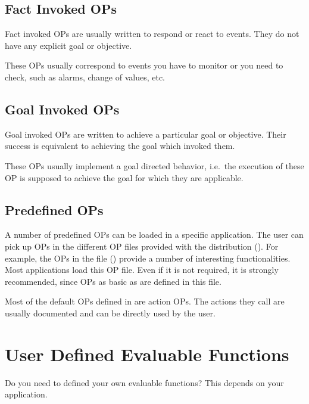 \subsection{Fact Invoked OPs}

Fact invoked OPs are usually written to respond or react to events. They do not
have any explicit goal or objective.

These OPs usually correspond to events you have to monitor or you need to
check, such as alarms, change of values, etc.

\subsection{Goal Invoked OPs}

Goal invoked OPs are written to achieve a particular goal or objective.
Their success is equivalent to achieving the goal which invoked them.

These OPs usually implement a goal directed behavior, i.e.\ the execution
of these OP is supposed to achieve the goal for which they are applicable.

\subsection{Predefined OPs}

A number of predefined OPs can be loaded in a specific application. The user
can pick up OPs in the different OP files provided with the distribution
(). For example, the OPs in the file 
() provide a number of interesting functionalities. 
Most applications load this OP file.  Even if it is not required, it is
strongly recommended, since OPs as basic as \code{=} are defined in this file.

Most of the default OPs defined in   are action OPs. The
actions they call are usually documented and can be directly used by the
user.

\section{User Defined Evaluable Functions}

Do you need to defined your own evaluable functions? This depends on your
application. %

